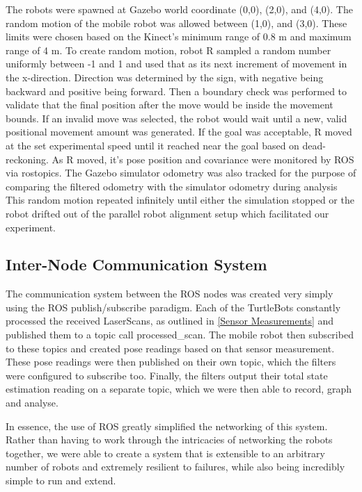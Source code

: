 \documentclass[conference]{IEEEtran} \usepackage[T1]{fontenc} \usepackage[backend=biber, style=ieee]{biblatex}
\begin{document}
The robots were spawned at Gazebo world coordinate (0,0), (2,0), and (4,0). The random motion of the mobile robot was
allowed between (1,0), and (3,0). These limits were chosen based on the Kinect's minimum range of 0.8 m and maximum range 
of 4 m. To create random motion, robot R sampled a random number uniformly between -1 and 1 and used that as its next increment
of movement in the x-direction. Direction was determined by the sign, with negative being backward and positive being forward. 
Then a boundary check was performed to validate that the final position after the move would be inside the movement bounds. 
If an invalid move was selected, the robot would wait until a new, valid positional movement amount was generated. If 
the goal was acceptable, R moved at the set experimental speed until it reached near the goal based on dead-reckoning. As R
moved, it's pose position and covariance were monitored by ROS via rostopics. The Gazebo simulator odometry was also tracked 
for the purpose of comparing the filtered odometry with the simulator odometry during analysis This random motion repeated infinitely 
until either the simulation stopped or the robot drifted out of the parallel robot alignment setup which facilitated our experiment.

\subsection{Inter-Node Communication System} \label{Inter-Node Communication System} The communication system between
the ROS nodes was created very simply using the ROS publish/subscribe paradigm. Each of the TurtleBots constantly
processed the received LaserScans, as outlined in \ref{Sensor Measurements} and published them to a topic call
processed\_scan. The mobile robot then subscribed to these topics and created pose readings based on that sensor
measurement. These pose readings were then published on their own topic, which the filters were configured to subscribe
too. Finally, the filters output their total state estimation reading on a separate topic, which we were then able to
record, graph and analyse.

In essence, the use of ROS greatly simplified the networking of this system. Rather than having to work through the
intricacies of networking the robots together, we were able to create a system that is extensible to an arbitrary number
of robots and extremely resilient to failures, while also being incredibly simple to run and extend.
\end{document}

